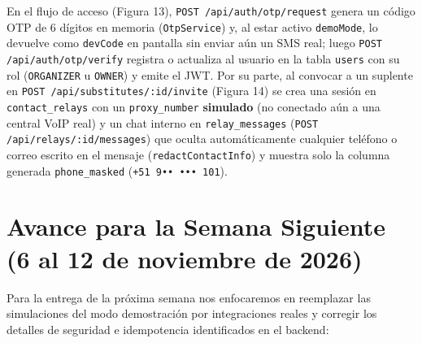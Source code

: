 \documentclass[10pt,a4paper]{article}
\begin{document}
\vspace{0.2cm}
En el flujo de acceso (Figura 13), \texttt{POST /api/auth/otp/request} genera un código OTP de 6 dígitos en memoria (\texttt{OtpService}) y, al estar activo \texttt{demoMode}, lo devuelve como \texttt{devCode} en pantalla sin enviar aún un SMS real; luego \texttt{POST /api/auth/otp/verify} registra o actualiza al usuario en la tabla \texttt{users} con su rol (\texttt{ORGANIZER} u \texttt{OWNER}) y emite el JWT. Por su parte, al convocar a un suplente en \texttt{POST /api/substitutes/:id/invite} (Figura 14) se crea una sesión en \texttt{contact\_relays} con un \texttt{proxy\_number} \textbf{simulado} (no conectado aún a una central VoIP real) y un chat interno en \texttt{relay\_messages} (\texttt{POST /api/relays/:id/messages}) que oculta automáticamente cualquier teléfono o correo escrito en el mensaje (\texttt{redactContactInfo}) y muestra solo la columna generada \texttt{phone\_masked} (\texttt{+51 9•• ••• 101}).

\section{Avance para la Semana Siguiente (6 al 12 de noviembre de 2026)}

Para la entrega de la próxima semana nos enfocaremos en reemplazar las simulaciones del modo demostración por integraciones reales y corregir los detalles de seguridad e idempotencia identificados en el backend:
\end{document}
